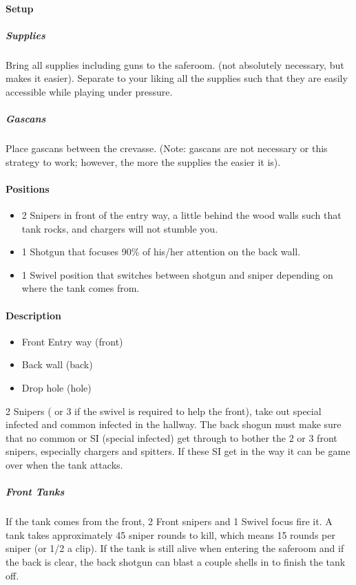 \paragraph{Setup}

\subparagraph{Supplies}

Bring all supplies including guns to the saferoom. (not absolutely necessary, but makes it easier). Separate to your liking all the supplies such that they are easily accessible while playing under pressure.

\subparagraph{Gascans}

Place gascans between the crevasse. (Note: gascans are not necessary or this strategy to work; however, the more the supplies the easier it is).

\paragraph{Positions}
\begin{itemize}
\item 2 Snipers in front of the entry way, a little behind the wood walls such that tank rocks, and chargers will not stumble you.
\item 1 Shotgun that focuses 90\% of his/her attention on the back wall.

\item 1 Swivel position that switches between shotgun and sniper depending on where the tank comes from.
\end{itemize}

\paragraph{Description}

\begin{itemize}
\item Front Entry way (front)
\item Back wall (back)
\item Drop hole (hole)
\end{itemize}

2 Snipers ( or 3 if the swivel is required to help the front), take out special infected and common infected in the hallway. The back shogun must make sure that no common or SI (special infected) get through to bother the 2 or 3 front snipers, especially chargers and spitters. If these SI get in the way it can be game over when the tank attacks.

\subparagraph{Front Tanks}
If the tank comes from the front, 2 Front snipers and 1 Swivel focus fire it. A tank takes approximately 45 sniper rounds to kill, which means 15 rounds per sniper (or 1/2 a clip). If the tank is still alive when entering the saferoom and if the back is clear, the back shotgun can blast a couple shells in to finish the tank off.

